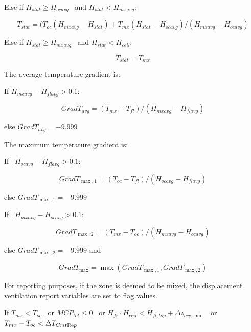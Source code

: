 {Else if \({H_{stat}} \ge {H_{ocavg}}\) ~and \({H_{stat}} < {H_{mxavg}}\):

\begin{equation}
{T_{stat}} = ({T_{oc}}({H_{mxavg}} - {H_{stat}}) + {T_{mx}}({H_{stat}} - {H_{ocavg}})/({H_{mxavg}} - {H_{ocavg}})
\end{equation}

Else if \({H_{stat}} \ge {H_{mxavg}}\) ~and \({H_{stat}} < {H_{ceil}}\):

\begin{equation}
{T_{stat}} = {T_{mx}}
\end{equation}

The average temperature gradient is:

If \({H_{mxavg}} - {H_{flavg}} > 0.1\):

\begin{equation}
Grad{T_{avg}} = ({T_{mx}} - {T_{fl}})/({H_{mxavg}} - {H_{flavg}})
\end{equation}

else \(Grad{T_{avg}} =  - 9.999\)

The maximum temperature gradient is:

If~ \({H_{ocavg}} - {H_{flavg}} > 0.1\):

\begin{equation}
Grad{T_{\max ,1}} = ({T_{oc}} - {T_{fl}})/({H_{ocavg}} - {H_{flavg}})
\end{equation}

else \(Grad{T_{\max ,1}} = - 9.999\)

If~ \({H_{mxavg}} - {H_{ocavg}} > 0.1\):

\begin{equation}
Grad{T_{\max ,2}} = ({T_{mx}} - {T_{oc}})/({H_{mxavg}} - {H_{ocavg}})
\end{equation}

else \(Grad{T_{\max ,2}} = - 9.999\) and

\begin{equation}
Grad{T_{\max }} = \max (Grad{T_{\max ,1}},Grad{T_{\max ,2}})
\end{equation}

For reporting purposes, if the zone is deemed to be mixed, the displacement ventilation report variables are set to flag values.

If \({T_{mx}} < {T_{oc}}\) ~or \(MC{P_{tot}} \le 0\) ~or \({H_{fr}} \cdot {H_{ceil}} < {H_{fl,top}} + \Delta {z_{occ,\min }}\) ~or \({T_{mx}} - {T_{oc}} < \Delta {T_{Crit{\mathop{\rm Re}\nolimits} p}}\)

}
